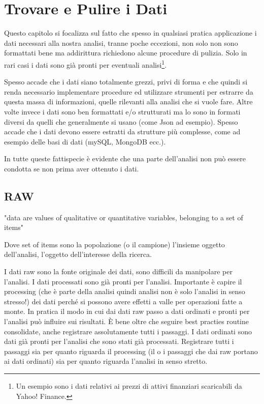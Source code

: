 \chapter{Trovare e Pulire i Dati}
Questo capitolo si focalizza sul fatto che spesso in qualsiasi pratica applicazione i dati necessari alla nostra analisi, tranne poche eccezioni, non solo non sono formattati bene ma addirittura richiedono alcune procedure di pulizia. Solo in rari casi i dati sono già pronti per eventuali analisi\footnote{Un esempio sono i dati relativi ai prezzi di attivi finanziari scaricabili da Yahoo! Finance.}.

Spesso accade che i dati siano totalmente grezzi, privi di forma e che quindi si renda necessario implementare procedure ed utilizzare strumenti per estrarre da questa massa  di informazioni, quelle rilevanti alla analisi che si vuole fare. Altre volte invece i dati sono ben formattati e/o strutturati ma lo sono in formati
diversi da quelli che generalmente si usano (come Json ad esempio). Spesso accade che i dati devono essere estratti da strutture più complesse, come ad esempio delle basi di dati (mySQL, MongoDB ecc.).

In tutte queste fattispecie è evidente che una parte dell'analisi non può essere condotta se non prima aver ottenuto i dati.


\section{RAW}

"data are values of qualitative or quantitative variables, belonging to a set of items"

Dove set of items sono la popolazione (o il campione) l'insieme oggetto dell'analisi, l'oggetto dell'interesse della ricerca.


I dati raw sono la fonte originale dei dati, sono difficili da manipolare per 
l'analisi.
I dati processati sono già pronti per l'analisi.
Importante è capire il processing (che è parte della analisi quindi analisi non è solo l'analisi in senso stresso!) dei dati perché si possono avere effetti a valle per operazioni fatte a monte. In pratica il modo in cui dai dati raw passo a dati ordinati 
e pronti per l'analisi può influire sui risultati.
È bene oltre che seguire best practies routine consolidate, anche registrare assolutamente
tutti i passaggi.
I dati ordinati sono dati già pronti per l'analisi che sono stati già processati.
Registrare tutti i passaggi sia per quanto riguarda il processing (il o i passaggi che dai raw portano ai dati ordinati) sia per quanto riguarda l'analisi in senso stretto.


